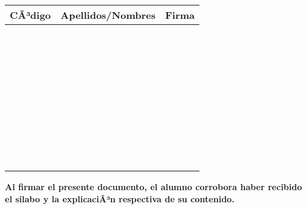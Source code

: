 \documentclass[final]{article}
\begin{document}
\begin{center}
\begin{tabularx}{\textwidth}{|p{2.5cm}|X|p{2.5cm}|}      \hline
{\bf CÃ³digo} & {\bf Apellidos/Nombres} & {\bf Firma} \\ \hline
 & & \\ \hline
 & & \\ \hline
 & & \\ \hline
 & & \\ \hline
 & & \\ \hline
 & & \\ \hline
 & & \\ \hline
 & & \\ \hline
 & & \\ \hline
 & & \\ \hline
 & & \\ \hline
 & & \\ \hline
 & & \\ \hline
 & & \\ \hline
 & & \\ \hline
 & & \\ \hline
 & & \\ \hline
 & & \\ \hline
 & & \\ \hline
 & & \\ \hline
 & & \\ \hline
 & & \\ \hline
 & & \\ \hline
 & & \\ \hline
 & & \\ \hline
 & & \\ \hline
 & & \\ \hline
 & & \\ \hline
 & & \\ \hline
 & & \\ \hline
 & & \\ \hline
 & & \\ \hline
 & & \\ \hline
 & & \\ \hline
 & & \\ \hline
 & & \\ \hline
 & & \\ \hline
 & & \\ \hline
 & & \\ \hline
 & & \\ \hline
\end{tabularx}
\end{center}

\vspace{0.5cm}
{\bf Al firmar el presente documento, el alumno corrobora haber recibido el silabo y la explicaciÃ³n respectiva de su contenido.}
\end{document}
